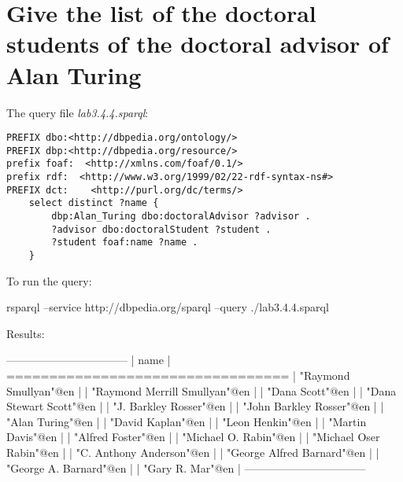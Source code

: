 \documentclass[a4paper, 12pt]{report}
\begin{document}
\section{Give the list of the doctoral students of the doctoral advisor of Alan Turing}       
The query file \emph{lab3.4.4.sparql}:
\begin{lstlisting}[frame=single]
PREFIX dbo:<http://dbpedia.org/ontology/>
PREFIX dbp:<http://dbpedia.org/resource/>
prefix foaf:  <http://xmlns.com/foaf/0.1/>
prefix rdf:  <http://www.w3.org/1999/02/22-rdf-syntax-ns#>
PREFIX dct:    <http://purl.org/dc/terms/>
    select distinct ?name {
        dbp:Alan_Turing dbo:doctoralAdvisor ?advisor .
        ?advisor dbo:doctoralStudent ?student .
        ?student foaf:name ?name .
    }
\end{lstlisting}
To run the query:
\begin{commandshell}
    rsparql --service http://dbpedia.org/sparql --query ./lab3.4.4.sparql
\end{commandshell}
Results:
\begin{messageshell}
---------------------------------
| name                          |
=================================
| "Raymond Smullyan"@en         |
| "Raymond Merrill Smullyan"@en |
| "Dana Scott"@en               |
| "Dana Stewart Scott"@en       |
| "J. Barkley Rosser"@en        |
| "John Barkley Rosser"@en      |
| "Alan Turing"@en              |
| "David Kaplan"@en             |
| "Leon Henkin"@en              |
| "Martin Davis"@en             |
| "Alfred Foster"@en            |
| "Michael O. Rabin"@en         |
| "Michael Oser Rabin"@en       |
| "C. Anthony Anderson"@en      |
| "George Alfred Barnard"@en    |
| "George A. Barnard"@en        |
| "Gary R. Mar"@en              |
---------------------------------
\end{messageshell}
\end{document}
